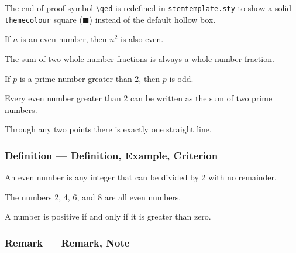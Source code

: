 The end-of-proof symbol \texttt{\textbackslash qed} is redefined in \texttt{stemtemplate.sty} to show a solid \texttt{themecolour} square (\textcolor{themecolour}{$\blacksquare$}) instead of the default hollow box.

\begin{lemma}
	\label{lem:even}
	If $n$ is an even number, then $n^2$ is also even.
\end{lemma}

\begin{proposition}
	\label{prop:rational}
	The sum of two whole-number fractions is always a whole-number fraction.
\end{proposition}

\begin{corollary}
	\label{cor:prime}
	If $p$ is a prime number greater than 2, then $p$ is odd.
\end{corollary}

\begin{conjecture}
	\label{con:goldbach}
	Every even number greater than 2 can be written as the sum of two prime numbers.
\end{conjecture}

\begin{axiom}
	\label{axm:line}
	Through any two points there is exactly one straight line.
\end{axiom}

\subsubsection{Definition --- Definition, Example, Criterion}

\begin{definition}
	\label{def:even}
	An even number is any integer that can be divided by 2 with no remainder.
\end{definition}

\begin{example}
	\label{ex:even}
	The numbers 2, 4, 6, and 8 are all even numbers.
\end{example}

\begin{criterion}
	\label{crit:positive}
	A number is positive if and only if it is greater than zero.
\end{criterion}

\subsubsection{Remark --- Remark, Note}


